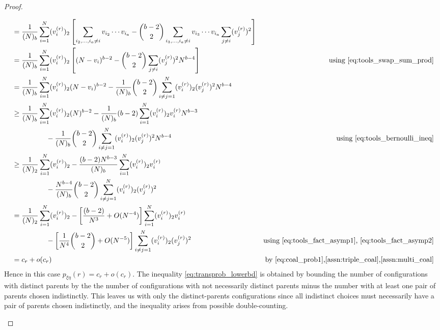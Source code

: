 \documentclass{article}
\begin{document}
\begin{proof}
\begin{enumerate}[label = \textbf{Case \arabic*.}]
\begin{align}
&= \frac{1}{(N)_b} \sum_{i=1}^N (v_i^{(r)})_2 \left[ \sum_{i_2,\dots,i_a\neq i} v_{i_2}\cdots v_{i_a} - \binom{b-2}{2} \sum_{i_3,\dots,i_a\neq i} v_{i_3}\cdots v_{i_a} \sum_{j \neq i} (v_j^{(r)})^2 \right] & \notag\\
&= \frac{1}{(N)_b} \sum_{i=1}^N (v_i^{(r)})_2 \left[ (N-v_i)^{b-2} - \binom{b-2}{2} \sum_{j\neq i} (v_j^{(r)})^2 N^{b-4} \right] &\text{using \eqref{eq:tools_swap_sum_prod}} \notag\\
&= \frac{1}{(N)_b} \sum_{i=1}^N (v_i^{(r)})_2  (N-v_i)^{b-2} - \frac{1}{(N)_b} \binom{b-2}{2} \sum_{i\neq j=1}^{N} (v_i^{(r)})_2 (v_j^{(r)})^2 N^{b-4} & \notag\\
&\geq \frac{1}{(N)_b} \sum_{i=1}^N (v_i^{(r)})_2  (N)^{b-2} - \frac{1}{(N)_b}(b-2)\sum_{i=1}^{N} (v_i^{(r)})_2 v_i^{(r)} N^{b-3} \notag\\
&\phantom{=\qquad\qquad} - \frac{1}{(N)_b}\binom{b-2}{2} \sum_{i\neq j=1}^{N} (v_i^{(r)})_2 (v_j^{(r)})^2 N^{b-4} &\text{using \eqref{eq:tools_bernoulli_ineq}} \notag\\
&\geq \frac{1}{(N)_2} \sum_{i=1}^N (v_i^{(r)})_2 - \frac{(b-2)N^{b-3}}{(N)_b}\sum_{i=1}^{N} (v_i^{(r)})_2 v_i^{(r)} \notag\\
&\phantom{=\qquad\qquad} -\frac{N^{b-4}}{(N)_b}\binom{b-2}{2} \sum_{i\neq j=1}^{N} (v_i^{(r)})_2 (v_j^{(r)})^2 & \notag\\
&= \frac{1}{(N)_2} \sum_{i=1}^N (v_i^{(r)})_2 - \left[\frac{(b-2)}{N^3} +O(N^{-4}) \right] \sum_{i=1}^{N} (v_i^{(r)})_2 v_i^{(r)} \notag\\
&\phantom{=\qquad\qquad} -\left[ \frac{1}{N^4}\binom{b-2}{2} + O(N^{-5}) \right] \sum_{i\neq j=1}^{N} (v_i^{(r)})_2 (v_j^{(r)})^2 &\text{using \eqref{eq:tools_fact_asymp1}, \eqref{eq:tools_fact_asymp2}} \notag\\
&= c_r + o(c_r) &\text{by \eqref{eq:coal_prob1},\ref{assn:triple_coal},\ref{assn:multi_coal}} \notag
\end{align}
Hence in this case $p_{\xi\eta}(r)=c_r +o(c_r)$.
The inequality \eqref{eq:transprob_lowerbd} is obtained by bounding the number of configurations with distinct parents by the the number of configurations with not necessarily distinct parents minus the number with at least one pair of parents chosen indistinctly. This leaves us with only the distinct-parents configurations since all indistinct choices must necessarily have a pair of parents chosen indistinctly, and the inequality arises from possible double-counting.


\end{enumerate}
\end{proof}
\end{document}
